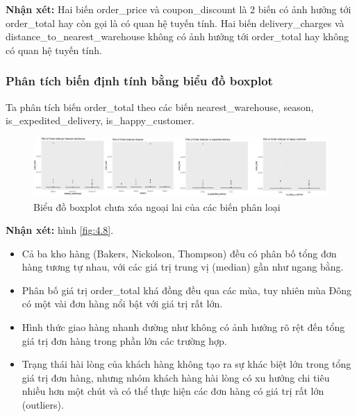 \textbf{Nhận xét:} Hai biến order\_price và coupon\_discount là 2 biến có ảnh hưởng tới order\_total hay còn gọi là có quan hệ tuyến tính. Hai biến delivery\_charges và distance\_to\_nearest\_warehouse không có ảnh hưởng tới order\_total hay không có quan hệ tuyến tính.

\subsubsection{Phân tích biến định tính bằng biểu đồ boxplot}
Ta phân tích biến order\_total theo các biến nearest\_warehouse, season, is\_expedited\_delivery, is\_happy\_customer.
\begin{figure}[!htbp]
    \centering
    \includegraphics[width=1\linewidth]{graphics/bang13.jpg}
    \caption{Biểu đồ boxplot chưa xóa ngoại lai của các biến phân loại}
\end{figure}

\textbf{Nhận xét:} hình \ref{fig:4.8}.
\begin{itemize}
    \item Cả ba kho hàng (Bakers, Nickolson, Thompson) đều có phân bố tổng đơn hàng tương tự nhau, với các giá trị trung vị (median) gần như ngang bằng.
    \item Phân bố giá trị order\_total khá đồng đều qua các mùa, tuy nhiên mùa Đông có một vài đơn hàng nổi bật với giá trị rất lớn.
    \item Hình thức giao hàng nhanh dường như không có ảnh hưởng rõ rệt đến tổng giá trị đơn hàng trong phần lớn các trường hợp.
    \item Trạng thái hài lòng của khách hàng không tạo ra sự khác biệt lớn trong tổng giá trị đơn hàng, nhưng nhóm khách hàng hài lòng có xu hướng chi tiêu nhiều hơn một chút và có thể thực hiện các đơn hàng có giá trị rất lớn (outliers).
\end{itemize}
